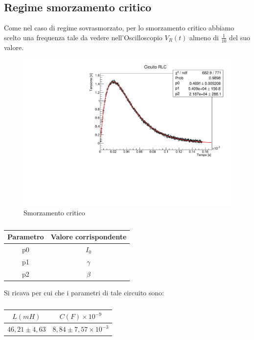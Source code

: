 \subsection{Regime smorzamento critico}
Come nel caso di regime sovrasmorzato, per lo smorzamento critico abbiamo scelto una frequenza tale da vedere nell'Oscilloscopio $V_{R}(t)$ almeno di $\frac{1}{10}$ del suo valore.
\begin{figure}[H]
    \centering
    \includegraphics[scale=.4]{Immagini/CircuitoRLC.pdf}
    \caption{Smorzamento critico}
\end{figure}

\begin{table}[H]
    \centering
    \begin{tabular}{cc}
    \toprule
      Parametro   & Valore corrispondente \\
    \midrule
       p0  & $I_0$ \\
       p1  & $\gamma$ \\
       p2  & $\beta$ \\
    \bottomrule
    \end{tabular}
    \caption{}
\end{table}

Si ricava per cui che i parametri di tale circuito sono:
\begin{table}[H]
    \centering
    \begin{tabular}{cc}
        \toprule
      $L (mH)$  & $C(F)\times 10^{-9}$ \\
         \midrule
    $46,21\pm 4,63$     & $8,84\pm 7,57\times 10^{-3}$\\
    \bottomrule
    \end{tabular}
    \caption{}
\end{table}